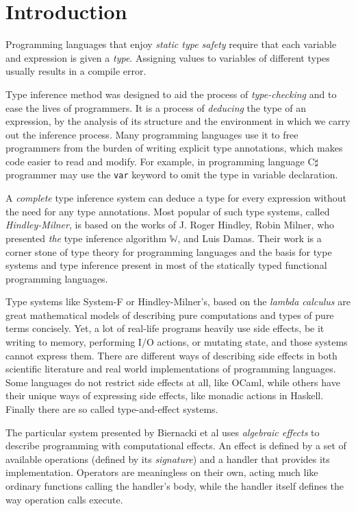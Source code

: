 \documentclass[declaration,shortabstract]{iithesis}
\author         {Dominik Gulczyński}
\theoremstyle{definition} \newtheorem{definition}{Definition}[section]
\begin{document}
\chapter{Introduction}

Programming languages that enjoy \textit{static type safety} require that
each variable and expression is given a \textit{type}.
Assigning values to variables of different types usually results in a compile error.

Type inference method was designed to aid the process of \textit{type-checking}
and to ease the lives of programmers. It is a process of \textit{deducing}
the type of an expression, by the analysis of its structure and the environment
in which we carry out the inference process. 
Many programming languages use it to free programmers from the burden of writing
explicit type annotations, which makes code easier to read and modify.
For example, in programming language C$\sharp$ programmer may
use the \texttt{var} keyword to omit the type in variable declaration.

A \textit{complete} type inference system can deduce a type for every
expression without the need for any type annotations.
Most popular of such type systems, called \textit{Hindley-Milner}, is based on the
works of J. Roger Hindley\cite{hindley},
Robin Milner, who presented \textit{the} type inference algorithm $\mathbb{W}$\cite{milner},
and Luis Damas\cite{principal}.
Their work is a corner stone of type theory for programming languages
and the basis for type systems and type inference present in most of the statically typed
functional programming languages.

Type systems like System-F or Hindley-Milner's, based on the \textit{lambda calculus}
are great mathematical models of describing pure computations and types of pure terms concisely.
Yet, a lot of real-life programs heavily use side effects,
be it writing to memory, performing I/O actions, or mutating state, and those systems cannot express them.
There are different ways of describing side effects in both scientific literature
and real world implementations of programming languages.
Some languages do not restrict side effects at all, like OCaml,
while others have their unique ways of expressing side effects,
like monadic actions in Haskell.
Finally there are so called type-and-effect systems.

The particular system presented by Biernacki et al\cite{binders-labels} uses \textit{algebraic effects} to describe
programming with computational effects.
An effect is defined by a set of available operations (defined by its \textit{signature})
and a handler that provides its implementation.
Operators are meaningless on their own, acting much like ordinary functions
calling the handler's body, while the handler itself defines the way operation calls execute.
\end{document}
